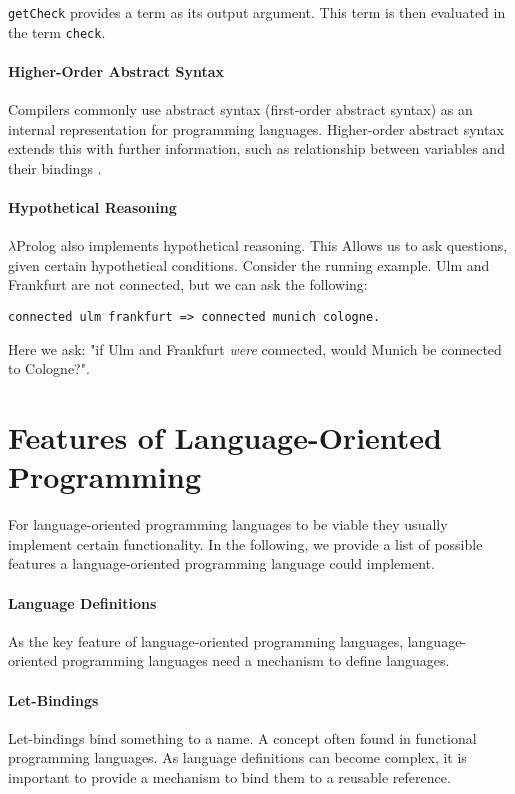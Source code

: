 \lstinline{getCheck} provides a term as its output argument. This term is then evaluated in the term \lstinline{check}.

\paragraph{Higher-Order Abstract Syntax}
Compilers commonly use abstract syntax (first-order abstract syntax) as an internal representation for programming languages. Higher-order abstract syntax extends this with further information, such as relationship between variables and their bindings \cite{pfenning_higher-order_1988}.


\paragraph{Hypothetical Reasoning}
$\lambda$Prolog also implements hypothetical reasoning. This Allows us to ask questions, given certain hypothetical conditions. Consider the running example. Ulm and Frankfurt are not connected, but we can ask the following:

\begin{verbatim}
connected ulm frankfurt => connected munich cologne.
\end{verbatim}

Here we ask: "if Ulm and Frankfurt \emph{were} connected, would Munich be connected to Cologne?".

\section{Features of Language-Oriented Programming}
\label{features-of-language-oriented-programming}

For language-oriented programming languages to be viable they usually implement certain functionality. In the following, we provide a list of possible features a language-oriented programming language could implement.

\paragraph{Language Definitions}
As the key feature of language-oriented programming languages, language-oriented programming languages need a mechanism to define languages.

\paragraph{Let-Bindings}
Let-bindings bind something to a name. A concept often found in functional programming languages. As language definitions can become complex, it is important to provide a mechanism to bind them to a reusable reference.

